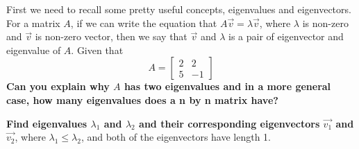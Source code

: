 \begin{enumerate}

\qitem First we need to recall some pretty useful concepts, eigenvalues and eigenvectors. For a matrix $A$, if we can write the
equation that $A\vec{v}=\lambda\vec{v}$, where $\lambda$ is non-zero and $\vec{v}$ is non-zero vector, then we say that $\vec{v}$ and $\lambda$ is a pair of eigenvector and eigenvalue of $A$.
Given that 
$$A = \begin{bmatrix}
  2 & 2 \\
  5 & -1
  \end{bmatrix}$$
\textbf{Can you explain why $A$ has two eigenvalues and in a more general case, how many eigenvalues does a n by n matrix have?}
\ws{
\vspace{30px}
}



\qitem \textbf{Find eigenvalues ${\lambda}_1$ and ${\lambda}_2$ and their corresponding eigenvectors $\vec{v_1}$ and $\vec{v_2}$}, where ${\lambda}_1\le{\lambda}_2$,
and both of the eigenvectors have length 1.

\ws{
\vspace{100px}
}


\end{enumerate}
